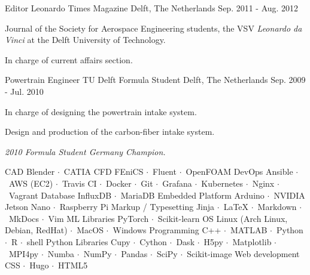 \documentclass[11pt, a4paper]{awesome-cv}
\newcommand{\sep}{$\cdot$~}
\begin{document}
\newpage


\begin{cventries}

  \cventry
    {Editor} %
    {Leonardo Times Magazine} %
    {Delft, The Netherlands} %
    {Sep. 2011 - Aug. 2012} %
    {
      \begin{cvitems} %
        \item {Journal of the Society for Aerospace Engineering students, the VSV \textit{Leonardo da Vinci} at the Delft University of Technology.}
        \item {In charge of current affairs section.}
      \end{cvitems}
    }

  \cventry
    {Powertrain Engineer}
    {TU Delft Formula Student}
    {Delft, The Netherlands}
    {Sep. 2009 - Jul. 2010}
    {
      \begin{cvitems}
        \item {In charge of designing the powertrain intake system.}
        \item {Design and production of the carbon-fiber intake system.}
        \item {\textit{2010 Formula Student Germany Champion.}}
      \end{cvitems}
    }

\end{cventries}




\begin{cvskills}
  \cvskill
    {CAD}
    {Blender \sep CATIA}
  \cvskill
    {CFD}
    {FEniCS \sep Fluent \sep OpenFOAM}
  \cvskill
    {DevOps}
    {Ansible \sep AWS (EC2) \sep Travis CI \sep Docker \sep Git \sep Grafana \sep Kubernetes \sep Nginx \sep Vagrant}
  \cvskill
    {Database}
    {InfluxDB \sep MariaDB}
  \cvskill
    {Embedded Platform}
    {Arduino \sep NVIDIA Jetson Nano \sep Raspberry Pi}
  \cvskill
    {Markup / Typesetting}
    {Jinja \sep LaTeX \sep Markdown \sep MkDocs \sep Vim}
  \cvskill
    {ML Libraries}
    {PyTorch \sep Scikit-learn}
  \cvskill
    {OS}
    {Linux (Arch Linux, Debian, RedHat) \sep MacOS \sep Windows}
  \cvskill
    {Programming}
    {C++ \sep MATLAB \sep Python \sep R \sep shell}
  \cvskill
    {Python Libraries}
    {Cupy \sep Cython \sep Dask \sep H5py \sep Matplotlib \sep MPI4py \sep Numba \sep NumPy \sep Pandas \sep SciPy \sep Scikit-image}
  \cvskill
    {Web development} %
    {CSS \sep Hugo \sep HTML5}
\end{cvskills}
\end{document}

